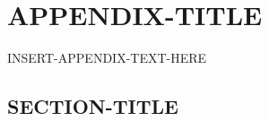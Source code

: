 \chapter{APPENDIX-TITLE}
\thispagestyle{plain}

\label{APPENDIX-LABEL}

INSERT-APPENDIX-TEXT-HERE

\section{SECTION-TITLE}
\label{SECTION-LABEL}

